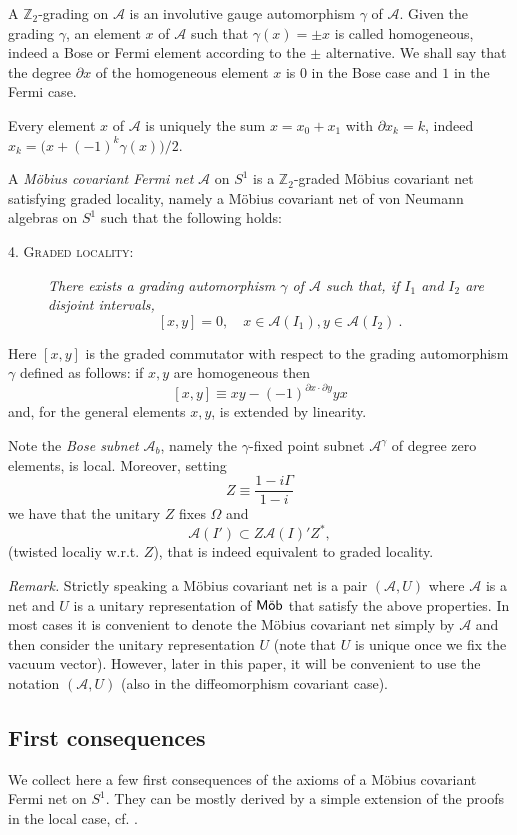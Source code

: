 \documentclass[11pt]{article}
\def\g{\gamma}
\def\Ga{\Gamma}
\def\A{{\cal A}}
\def\Mob{{\rm\textsf{M\"ob}}}
\def\A{{\mathcal A}}
\begin{document}
A $\mathbb Z_2$-grading on $\A$ is an involutive gauge automorphism $\g$ of $\A$. Given the grading $\g$, an element $x$ of $\A$ such that $\g(x)=\pm x$ is called homogeneous, indeed a Bose or Fermi element according to the $\pm$ alternative. 
We shall say that the degree $\partial x$ of the homogeneous element $x$ is $0$ in the Bose case and $1$ in the Fermi case.

Every element $x$ of $\A$ is uniquely the sum $x = x_0 + x_1$ with $\partial x_k=k$, indeed 
$x_k = \big(x  + (-1)^k \g(x)\big)/2$.

A  {\em M\"obius covariant Fermi net} $\A$ on $S^1$ is a $\mathbb Z_2$-graded M\"obius covariant net satisfying graded locality, namely a  M\"obius covariant net of 
von Neumann algebras on $S^1$ such that the following holds:
%
\begin{description}
\item[\textnormal{\textsc{4. Graded locality}}:]
{\it There exists a grading automorphism $\g$ of $\A$ such that,  if $I_1$ and $I_2$ are disjoint intervals,}
\[
[x,y] = 0,\quad x\in\A(I_1), y\in\A(I_2) \ .
\]
\end{description}
Here $[x,y]$ is the graded commutator with respect to the grading automorphism $\g$ defined as follows: if $x,y$ are homogeneous then
\[
[x,y]\equiv xy - (-1)^{\partial x \cdot \partial y}yx
\]
and, for the general elements $x,y$, is  extended by linearity.

Note the \emph{Bose subnet} $\A_b$, namely the $\g$-fixed point subnet $\A^\g$ of degree zero elements, is local. Moreover, setting
\[
Z\equiv \frac{1 - i\Ga}{1 - i}
\]
we have that the unitary $Z$ fixes $\Omega$ and
\[
\A(I')\subset Z\A(I)'Z^*,
\]
(twisted localiy w.r.t. $Z$), that is indeed equivalent to graded locality.
\medskip

\noindent
{\it Remark.} Strictly speaking a M\"obius covariant net is a pair $(\A, U)$ where $\A$ is a net and $U$ is a unitary representation of $\Mob$ that satisfy the above properties. In most cases it is convenient to denote the M\"obius covariant net simply by $\A$ and then consider the unitary representation $U$ (note that $U$ is unique once we fix the vacuum vector). However, later in this paper, it will be convenient to use the notation $(\A, U)$ (also in the diffeomorphism covariant case).
%
\subsection{First consequences}
We collect here a few first consequences of the axioms of a M\"obius covariant Fermi net on $S^1$. They can be mostly derived by a simple extension of the proofs in the local case, cf. \cite{DLR,LR2}.
%
\end{document}
